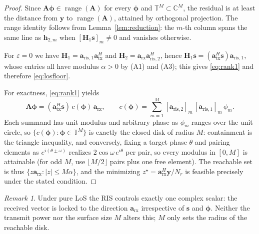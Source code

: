 \documentclass[11pt]{article}
\theoremstyle{remark}
\newtheorem{remark}{Remark}
\begin{document}
\begin{proof}
Since $\mathbf{A}\boldsymbol{\phi}\in\operatorname{range}(\mathbf{A})$ for every
$\boldsymbol{\phi}$ and $\mathbb{T}^{M}\subset\mathbb{C}^{M}$, the residual is at
least the distance from $\mathbf{y}$ to $\operatorname{range}(\mathbf{A})$,
attained by orthogonal projection. The range identity follows from
Lemma~\ref{lem:reduction}: the $m$-th column spans the same line as
$\mathbf{h}_{2,m}$ when $[\mathbf{H}_1\mathbf{s}]_m\neq0$ and vanishes otherwise.

For $\varepsilon=0$ we have
$\mathbf{H}_1=\mathbf{a}_{\mathrm{ris},1}\mathbf{a}_{\mathrm{tx}}^{H}$ and
$\mathbf{H}_2=\mathbf{a}_{\mathrm{rx}}\mathbf{a}_{\mathrm{ris},2}^{H}$, hence
$\mathbf{H}_1\mathbf{s}
 =(\mathbf{a}_{\mathrm{tx}}^{H}\mathbf{s})\mathbf{a}_{\mathrm{ris},1}$, whose
entries all have modulus $\alpha>0$ by (A1) and (A3); this gives
\eqref{eq:rank1} and therefore \eqref{eq:losfloor}.

For exactness, \eqref{eq:rank1} yields
\begin{equation}
\mathbf{A}\boldsymbol{\phi}
=(\mathbf{a}_{\mathrm{tx}}^{H}\mathbf{s})\,c(\boldsymbol{\phi})\,
 \mathbf{a}_{\mathrm{rx}},
\qquad
c(\boldsymbol{\phi})=\sum_{m=1}^{M}
 \overline{[\mathbf{a}_{\mathrm{ris},2}]_m}\,
 [\mathbf{a}_{\mathrm{ris},1}]_m\,\phi_m .
\label{eq:cphi}
\end{equation}
Each summand has unit modulus and arbitrary phase as $\phi_m$ ranges over the
unit circle, so $\{c(\boldsymbol{\phi}):\boldsymbol{\phi}\in\mathbb{T}^{M}\}$ is
exactly the closed disk of radius $M$: containment is the triangle inequality,
and conversely, fixing a target phase $\theta$ and pairing elements as
$e^{i(\theta\pm\omega)}$ realizes $2\cos\omega\,e^{i\theta}$ per pair, so every
modulus in $[0,M]$ is attainable (for odd $M$, use $\lfloor M/2\rfloor$ pairs
plus one free element). The reachable set is thus
$\{z\mathbf{a}_{\mathrm{rx}}:|z|\le M\alpha\}$, and the minimizing
$z^{\star}=\mathbf{a}_{\mathrm{rx}}^{H}\mathbf{y}/N_r$ is feasible precisely
under the stated condition.
\end{proof}

\begin{remark}
Under pure LoS the RIS controls exactly one complex scalar: the received vector
is locked to the direction $\mathbf{a}_{\mathrm{rx}}$ irrespective of
$\mathbf{s}$ and $\boldsymbol{\phi}$. Neither the transmit power nor the surface
size $M$ alters this; $M$ only sets the radius of the reachable disk.
\end{remark}
\end{document}
